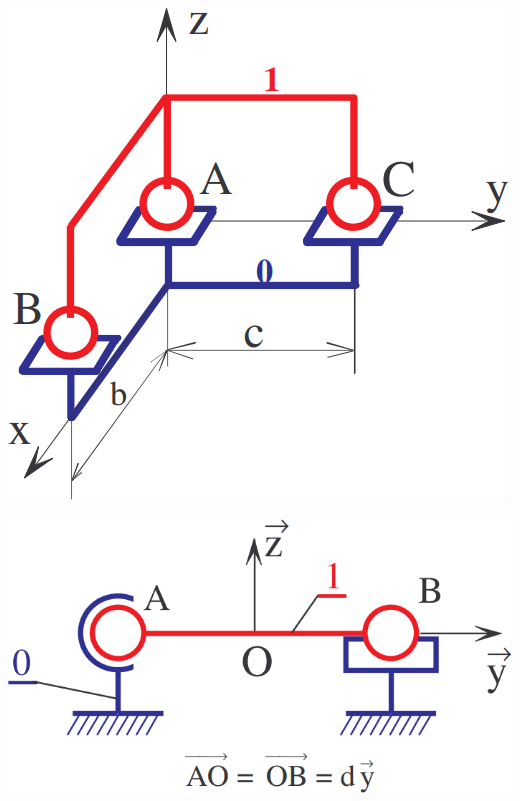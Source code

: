 \documentclass[10pt,fleqn]{article} %
\begin{document}
\begin{multicols}{2}
\begin{multicols}{2}
\begin{center}
\end{center}

\begin{center}
\includegraphics[width=.8\linewidth]{images/fig_04.png}
\end{center}

\begin{center}
\includegraphics[width=.8\linewidth]{images/fig_05.png}
\end{center}


\end{multicols}
\end{multicols}
\end{document}
